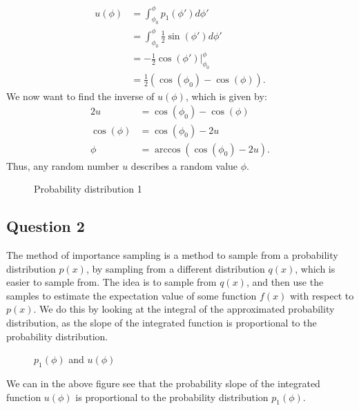 \documentclass[a4paper]{article}
\begin{document}
\begin{align*}
    u(\phi) &= \int_{\phi_0}^\phi p_1(\phi')d{\phi'}\\
    &= \int_{\phi_0}^\phi \frac{1}{2}\sin(\phi')d{\phi'}\\
    &= -\frac{1}{2}\cos(\phi')\Big|_{\phi_0}^\phi\\
    &= \frac{1}{2}\left(\cos(\phi_0) - \cos(\phi)\right).
\end{align*}We now want to find the inverse of $u(\phi)$, which is given by:
\begin{align*}
    2u &= \cos(\phi_0) - \cos(\phi)\\
    \cos(\phi) &= \cos(\phi_0) - 2u\\
    \phi &= \arccos(\cos(\phi_0) - 2u).
\end{align*}Thus, any random number $u$ describes a random value $\phi$.
\begin{figure}[H]
    \centering
    \caption{Probability distribution 1}
\end{figure}\noindent



\subsection*{Question 2}

The method of importance sampling is a method to sample from a probability distribution $p(x)$, by sampling from a different distribution $q(x)$, which is easier to sample from.
The idea is to sample from $q(x)$, and then use the samples to estimate the expectation value of some function $f(x)$ with respect to $p(x)$.
We do this by looking at the integral of the approximated probability distribution, as the slope of the integrated function is proportional to the probability distribution.

\begin{figure}[H]
    \centering
    \caption{$p_1(\phi)$ and $u(\phi)$}
\end{figure}\noindent
We can in the above figure see that the probability slope of the integrated function $u(\phi)$ is proportional to the probability distribution $p_1(\phi)$.
\end{document}
